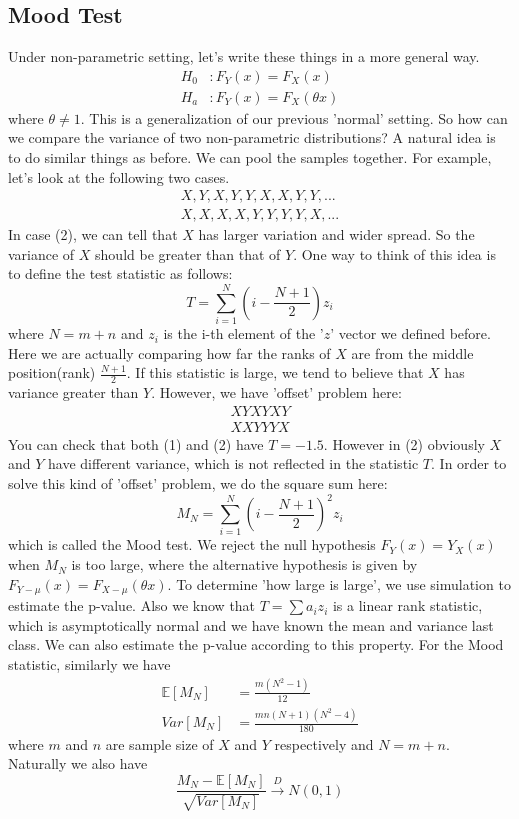 \documentclass[twoside]{article}
\begin{document}
	\subsection{Mood Test}
	Under non-parametric setting, let's write these things in a more general way. 
	\begin{align*}
		H_0 &: F_Y(x) = F_X(x) \\
		H_a &: F_Y(x) = F_X(\theta x)
	\end{align*}
	where $\theta \neq 1$. This is a generalization of our previous 'normal' setting. So how can we compare the variance of two non-parametric distributions? A natural idea is to do similar things as before. We can pool the samples together. For example, let's look at the following two cases. 
	\begin{align*}
		X, Y, X, Y, Y, X, X, Y, Y,  ... \tag{1} \\
		X, X, X, X, Y, Y, Y, Y, X, ... \tag{2}
	\end{align*}
	In case (2), we can tell that $X$ has larger variation and wider spread. So the variance of $X$ should be greater than that of $Y$. One way to think of this idea is to define the test statistic as follows: 
	$$
	T = \sum_{i=1}^{N} \left( i - \frac{N+1}{2} \right) z_i
	$$
	where $N = m+n$ and $z_i$ is the i-th element of the '$z$' vector we defined before. Here we are actually comparing how far the ranks of $X$ are from the middle position(rank) $\frac{N+1}{2}$. If this statistic is large, we tend to believe that $X$ has variance greater than $Y$. However, we have 'offset' problem here: 
	\begin{align*}
		XYXYXY \tag{1} \\
		XXYYYX \tag{2}
	\end{align*}
	You can check that both (1) and (2) have $T = -1.5$. However in (2) obviously $X$ and $Y$ have different variance, which is not reflected in the statistic $T$. In order to solve this kind of 'offset' problem, we do the square sum here:
	$$
	M_N = \sum_{i=1}^{N} \left( i - \frac{N+1}{2} \right)^2 z_i
	$$
	which is called the Mood test. We reject the null hypothesis $F_Y(x) = Y_X(x)$ when $M_N$ is too large, where the alternative hypothesis is given by $F_{Y - \mu}(x) = F_{X - \mu}(\theta x)$. To determine 'how large is large', we use simulation to estimate the p-value. Also we know that $T = \sum a_i z_i$ is a linear rank statistic, which is asymptotically normal and we have known the mean and variance last class. We can also estimate the p-value according to this property. For the Mood statistic, similarly we have 
	\begin{align*}
		\mathbb{E} \left[ M_N \right] &= \frac{m(N^2 - 1)}{12} \\
		Var \left[ M_N \right] &= \frac{mn (N+1) (N^2 - 4)}{180}
	\end{align*}
	where $m$ and $n$ are sample size of $X$ and $Y$ respectively and $N = m+n$. Naturally we also have
	$$
	\frac{M_N - \mathbb{E} \left[ M_N \right]}{\sqrt{Var \left[ M_N \right]}} \xrightarrow{D} N \left( 0,1 \right)
	$$
\end{document}
